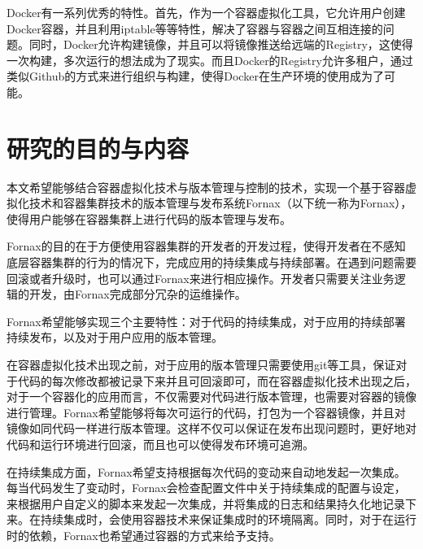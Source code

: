 Docker有一系列优秀的特性。首先，作为一个容器虚拟化工具，它允许用户创建Docker容器，并且利用iptable等等特性，解决了容器与容器之间互相连接的问题。同时，Docker允许构建镜像，并且可以将镜像推送给远端的Registry，这使得一次构建，多次运行的想法成为了现实。而且Docker的Registry允许多租户，通过类似Github的方式来进行组织与构建，使得Docker在生产环境的使用成为了可能。


\section{研究的目的与内容}

本文希望能够结合容器虚拟化技术与版本管理与控制的技术，实现一个基于容器虚拟化技术和容器集群技术的版本管理与发布系统Fornax（以下统一称为Fornax），使得用户能够在容器集群上进行代码的版本管理与发布。

Fornax的目的在于方便使用容器集群的开发者的开发过程，使得开发者在不感知底层容器集群的行为的情况下，完成应用的持续集成与持续部署。在遇到问题需要回滚或者升级时，也可以通过Fornax来进行相应操作。开发者只需要关注业务逻辑的开发，由Fornax完成部分冗杂的运维操作。

Fornax希望能够实现三个主要特性：对于代码的持续集成，对于应用的持续部署持续发布，以及对于用户应用的版本管理。

在容器虚拟化技术出现之前，对于应用的版本管理只需要使用git等工具，保证对于代码的每次修改都被记录下来并且可回滚即可，而在容器虚拟化技术出现之后，对于一个容器化的应用而言，不仅需要对代码进行版本管理，也需要对容器的镜像进行管理。Fornax希望能够将每次可运行的代码，打包为一个容器镜像，并且对镜像如同代码一样进行版本管理。这样不仅可以保证在发布出现问题时，更好地对代码和运行环境进行回滚，而且也可以使得发布环境可追溯。

在持续集成方面，Fornax希望支持根据每次代码的变动来自动地发起一次集成。每当代码发生了变动时，Fornax会检查配置文件中关于持续集成的配置与设定，来根据用户自定义的脚本来发起一次集成，并将集成的日志和结果持久化地记录下来。在持续集成时，会使用容器技术来保证集成时的环境隔离。同时，对于在运行时的依赖，Fornax也希望通过容器的方式来给予支持。\cite{wangfei, zhangjian}

